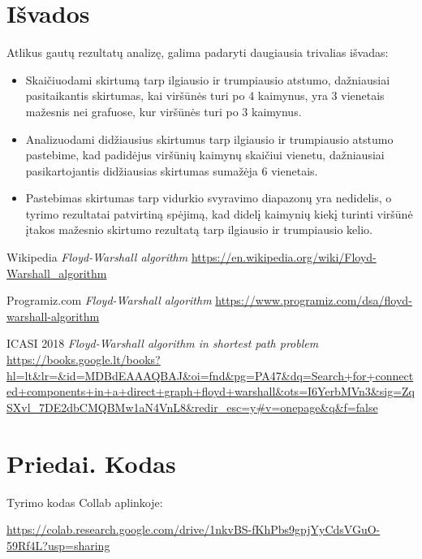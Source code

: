 \documentclass[bibliography=totoc]{article}
\begin{document}
\newpage 
\section*{Išvados}
\label{sec:isvados}
Atlikus gautų rezultatų analizę, galima padaryti daugiausia trivalias išvadas:



\begin{itemize}
\item Skaičiuodami skirtumą tarp ilgiausio ir trumpiausio atstumo, dažniausiai pasitaikantis skirtumas, kai viršūnės turi po 4 kaimynus, yra 3 vienetais mažesnis nei grafuose, kur viršūnės turi po 3 kaimynus.
\item  Analizuodami didžiausius skirtumus tarp ilgiausio ir trumpiausio atstumo pastebime, kad padidėjus viršūnių kaimynų skaičiui vienetu, dažniausiai pasikartojantis didžiausias skirtumas sumažėja 6 vienetais.
\item Pastebimas skirtumas tarp vidurkio svyravimo diapazonų yra nedidelis, o tyrimo rezultatai patvirtiną spėjimą, kad didelį kaimynių kiekį turinti viršūnė įtakos mažesnio skirtumo rezultatą tarp ilgiausio ir trumpiausio kelio.




\end{itemize}





\newpage 

%

%

\begin{thebibliography}{}

        Wikipedia
        \newblock \emph{Floyd-Warshall algorithm}
        \newblock \url{https://en.wikipedia.org/wiki/Floyd-Warshall_algorithm}

        Programiz.com
        \newblock \emph{Floyd-Warshall algorithm}
        \newblock \url{https://www.programiz.com/dsa/floyd-warshall-algorithm}

    ICASI 2018
    \newblock \emph{Floyd-Warshall algorithm in shortest path problem}
        \newblock \url{https://books.google.lt/books?hl=lt&lr=&id=MDBdEAAAQBAJ&oi=fnd&pg=PA47&dq=Search+for+connected+components+in+a+direct+graph+floyd+warshall&ots=I6YerbMVn3&sig=ZqSXvl_7DE2dbCMQBMw1aN4VnL8&redir_esc=y#v=onepage&q&f=false}
\end{thebibliography}



\newpage 
\appendix
\section*{Priedai. Kodas}

Tyrimo kodas Collab aplinkoje:

\url{https://colab.research.google.com/drive/1nkvBS-fKhPbs9gpjYyCdsVGuO-59Rf4L?usp=sharing}
\end{document}
